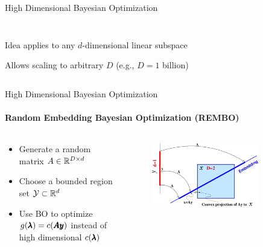 \begin{frame}[c]{High Dimensional Bayesian Optimization}
\begin{itemize}
\begin{columns}[T]
\begin{column}{0.5\linewidth}
\begin{figure}
    \end{figure}
    \end{column}
\end{columns}
    \pause
\begin{columns}
\begin{column}{0.45\linewidth}
    \vspace{-8em}
    \item Idea applies to any $d$-dimensional linear subspace
    \item Allows scaling to arbitrary $D$ (e.g., $D=1$ billion)
\end{column}
\begin{column}{0.5\linewidth}

\end{column}
\end{columns}
\end{itemize}


\end{frame}

\begin{frame}[c]{High Dimensional Bayesian Optimization}
\framesubtitle{Random Embedding Bayesian Optimization (REMBO)}
\begin{columns}[T]
\begin{column}{0.5\textwidth}
\begin{itemize}
    \item Generate a random matrix $A \in \mathbb{R}^{D \times d}$
    \item Choose a bounded region set $\mathcal{Y}\subset\mathbb{R}^d$
    \item Use BO to optimize $g(\pmb{\lambda})=c(\pmb{Ay})$ instead of high dimensional $c(\pmb{\lambda})$
\end{itemize}
\end{column}
\begin{column}{0.5\textwidth}
\begin{figure}
    \includegraphics[width=0.8\textwidth]{images/highdim_images/Embedding.png}
\end{figure}
\end{column}

\end{columns} 
\end{frame}

